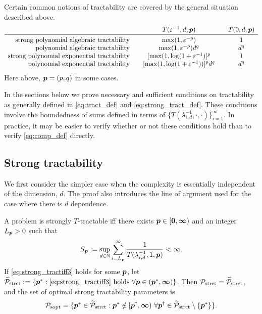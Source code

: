 \documentclass[11pt,a4paper]{article}
\begin{document}
Certain common notions of tractability are covered by the general situation described above.
\begin{equation*}
	\begin{array}{r@{\qquad}c@{\qquad}cc}
		& T(\varepsilon^{-1},d,\vp)
		& T(0,d,\vp)\\
		\toprule
		\text{strong polynomial algebraic  tractability} & \max(1,\varepsilon^{-p}) & 1\\
		\text{polynomial algebraic tractability} & \max(1,\varepsilon^{-p})d^{q} & d^{q}\\
		\text{strong polynomial exponential tractability} &  [\max(1,\log(1 + \varepsilon^{-1})]^p & 1\\
		\text{polynomial exponential tractability} &
		[\max(1,\log(1 + \varepsilon^{-1}))]^p  d^{q} & d^{q}
	\end{array}
\end{equation*}
Here above, $\boldsymbol{p} = (p,q)$ in some cases.


In the sections below we prove necessary and sufficient conditions on tractability as generally defined in \eqref{eq:tract_def} and \eqref{eq:strong_tract_def}.  These conditions involve the boundedness of sums defined in terms of $\{T(\lambda_{i,d}^{-1},\cdot, \cdot)\}_{i=1}^\infty$.  In practice, it may be easier to verify whether or not these conditions hold than to verify \eqref{eq:comp_def} directly.


\subsection{Strong tractability}

We first consider the simpler case when the complexity is essentially independent of the dimension, $d$.  The proof also introduces the line of argument used for the case where there is $d$ dependence.

\begin{theorem}\label{thm_main_strong_tract2}
A problem is strongly $T$-tractable iff there exists $\boldsymbol{p} \in [\boldsymbol{0}, \boldsymbol{\infty})$ and an integer $L_{\boldsymbol{p}} > 0$ such that
\begin{equation} \label{eq:strong_tractiff3}
     S_{\boldsymbol{p}}:=\sup_{d \in \mathbb{N}} \sum_{i = L_{\boldsymbol{p}}}^\infty \frac{1}{T(\lambda_{i,d}^{-1},1,\boldsymbol{p})} < \infty.
\end{equation}
If \eqref{eq:strong_tractiff3} holds for some $\boldsymbol{p}$, let  $\widetilde{\mathcal{P}}_{\textup{strct}} : = \{\boldsymbol{p}^* : \eqref{eq:strong_tractiff3} \text{ holds }\forall \boldsymbol{p} \in (\boldsymbol{p}^*,\boldsymbol{\infty})\}$.  Then $\mathcal{P}_{\textup{strct}} = \widetilde{\mathcal{P}}_{\textup{strct}}$, and the set of optimal strong tractability parameters is
\[
	\mathcal{P}_{\textup{sopt}} =
	\{\boldsymbol{p}^* \in \widetilde{\mathcal{P}}_{\textup{strct}} :  \boldsymbol{p}^* \notin [\boldsymbol{p}^\dagger,\boldsymbol{\infty}) \ \forall \boldsymbol{p}^\dagger \in  \widetilde{\mathcal{P}}_{\textup{strct}} \setminus \{\boldsymbol{p}^*\} \}.
\]
\end{theorem}
\end{document}
